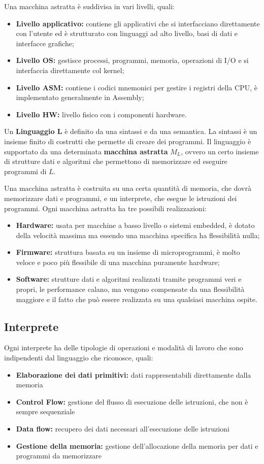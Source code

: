 \documentclass[a4paper, 10pt]{article}
\begin{document}
	Una macchina astratta è suddivisa in vari livelli, quali:
	\begin{itemize}
		\item \textbf{Livello applicativo:} contiene gli applicativi che si interfacciano direttamente con l'utente ed è strutturato con linguaggi ad alto livello, basi di dati e interfacce grafiche;
		\item \textbf{Livello OS:} gestisce processi, programmi, memoria, operazioni di I/O e si interfaccia direttamente col kernel;
		\item \textbf{Livello ASM:} contiene i codici mnemonici per gestire i registri della CPU, è implementato generalmente in Assembly;
		\item \textbf{Livello HW:} livello fisico con i componenti hardware.
	\end{itemize}
	
	Un \textbf{Linguaggio L} è definito da una sintassi e da una semantica. La sintassi è un insieme finito di costrutti che permette di creare dei programmi. Il linguaggio è supportato da una determinata \textbf{macchina astratta} $M_L$, ovvero un certo insieme di strutture dati e algoritmi che permettono di memorizzare ed eseguire programmi di $L$.
	
	Una macchina astratta è costruita su una certa quantità di memoria, che dovrà memorizzare dati e programmi, e un interprete, che esegue le istruzioni dei programmi.
	Ogni macchina astratta ha tre possibili realizzazioni:
	\begin{itemize}
		\item \textbf{Hardware:} usata per macchine a basso livello o sistemi embedded, è dotato della velocità massima ma essendo una macchina specifica ha flessibilità nulla;
		\item \textbf{Firmware:} struttura basata su un insieme di microprogrammi, è molto veloce e poco più flessibile di una macchina puramente hardware;
		\item \textbf{Software:} strutture dati e algoritmi realizzati tramite programmi veri e propri, le performance calano, ma vengono compensate da una flessibilità maggiore e il fatto che può essere realizzata su una qualsiasi macchina ospite.
	\end{itemize}
	
	\subsection{Interprete}
	Ogni interprete ha delle tipologie di operazioni e modalità di lavoro che sono indipendenti dal linguaggio che riconosce, quali:
	\begin{itemize}
		\item \textbf{Elaborazione dei dati primitivi:} dati rappresentabili direttamente dalla memoria
		\item \textbf{Control Flow:} gestione del flusso di esecuzione delle istruzioni, che non è sempre sequenziale
		\item \textbf{Data flow:} recupero dei dati necessari all'esecuzione delle istruzioni
		\item \textbf{Gestione della memoria:} gestione dell'allocazione della memoria per dati e programmi da memorizzare
	\end{itemize}
	
\end{document}
